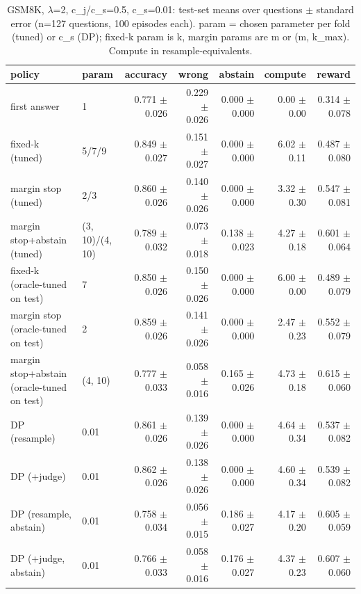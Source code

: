\begin{table}[t]
\centering
\small
\caption{GSM8K, $\lambda$=2, c\_j/c\_s=0.5, c\_s=0.01: test-set means over questions $\pm$ standard error (n=127 questions, 100 episodes each). param = chosen parameter per fold (tuned) or c\_s (DP); fixed-k param is k, margin params are m or (m, k\_max). Compute in resample-equivalents.}
\label{tab:headline_gsm8k_lam2_jr0.5}
\begin{tabular}{llrrrrr}
\toprule
policy & param & accuracy & wrong & abstain & compute & reward \\
\midrule
first answer & 1 & 0.771 $\pm$ 0.026 & 0.229 $\pm$ 0.026 & 0.000 $\pm$ 0.000 & 0.00 $\pm$ 0.00 & 0.314 $\pm$ 0.078 \\
fixed-k (tuned) & 5/7/9 & 0.849 $\pm$ 0.027 & 0.151 $\pm$ 0.027 & 0.000 $\pm$ 0.000 & 6.02 $\pm$ 0.11 & 0.487 $\pm$ 0.080 \\
margin stop (tuned) & 2/3 & 0.860 $\pm$ 0.026 & 0.140 $\pm$ 0.026 & 0.000 $\pm$ 0.000 & 3.32 $\pm$ 0.30 & 0.547 $\pm$ 0.081 \\
margin stop+abstain (tuned) & (3, 10)/(4, 10) & 0.789 $\pm$ 0.032 & 0.073 $\pm$ 0.018 & 0.138 $\pm$ 0.023 & 4.27 $\pm$ 0.18 & 0.601 $\pm$ 0.064 \\
fixed-k (oracle-tuned on test) & 7 & 0.850 $\pm$ 0.026 & 0.150 $\pm$ 0.026 & 0.000 $\pm$ 0.000 & 6.00 $\pm$ 0.00 & 0.489 $\pm$ 0.079 \\
margin stop (oracle-tuned on test) & 2 & 0.859 $\pm$ 0.026 & 0.141 $\pm$ 0.026 & 0.000 $\pm$ 0.000 & 2.47 $\pm$ 0.23 & 0.552 $\pm$ 0.079 \\
margin stop+abstain (oracle-tuned on test) & (4, 10) & 0.777 $\pm$ 0.033 & 0.058 $\pm$ 0.016 & 0.165 $\pm$ 0.026 & 4.73 $\pm$ 0.18 & 0.615 $\pm$ 0.060 \\
DP (resample) & 0.01 & 0.861 $\pm$ 0.026 & 0.139 $\pm$ 0.026 & 0.000 $\pm$ 0.000 & 4.64 $\pm$ 0.34 & 0.537 $\pm$ 0.082 \\
DP (+judge) & 0.01 & 0.862 $\pm$ 0.026 & 0.138 $\pm$ 0.026 & 0.000 $\pm$ 0.000 & 4.60 $\pm$ 0.34 & 0.539 $\pm$ 0.082 \\
DP (resample, abstain) & 0.01 & 0.758 $\pm$ 0.034 & 0.056 $\pm$ 0.015 & 0.186 $\pm$ 0.027 & 4.17 $\pm$ 0.20 & 0.605 $\pm$ 0.059 \\
DP (+judge, abstain) & 0.01 & 0.766 $\pm$ 0.033 & 0.058 $\pm$ 0.016 & 0.176 $\pm$ 0.027 & 4.37 $\pm$ 0.23 & 0.607 $\pm$ 0.060 \\
\bottomrule
\end{tabular}
\end{table}
